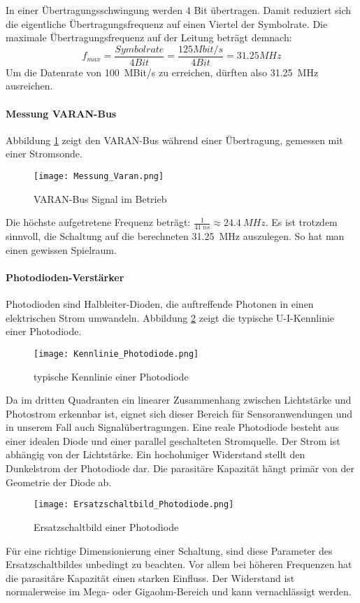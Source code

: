 In einer Übertragungsschwingung werden 4 Bit übertragen. Damit reduziert sich die eigentliche Übertragungsfrequenz auf einen Viertel der Symbolrate. Die maximale Übertragungsfrequenz auf der Leitung beträgt demnach: 
\begin{equation}\label{eq:MLT3}
f_{max}=\frac{Symbolrate}{4 Bit}=\frac{125Mbit/s}{4 Bit}=31.25 MHz
\end{equation}
Um die Datenrate von \SI{100}{MBit/s} zu erreichen, dürften also \SI{31.25}{MHz} ausreichen.

\paragraph{Messung VARAN-Bus}
Abbildung \ref{fig:Messung_Varan} zeigt den VARAN-Bus während einer Übertragung, gemessen mit einer Stromsonde.
\begin{figure}[H]
	\centering
	\texttt{[image: Messung\_Varan.png]}
	\caption{VARAN-Bus Signal im Betrieb}\label{fig:Messung_Varan}
\end{figure}
Die höchste aufgetretene Frequenz beträgt: $\frac{1}{\SI{41}{ns}}\approx \SI{24.4}{MHz}$. Es ist trotzdem sinnvoll, die Schaltung auf die berechneten \SI{31.25}{MHz} auszulegen. So hat man einen gewissen Spielraum.

\paragraph{Photodioden-Verstärker}
Photodioden sind Halbleiter-Dioden, die auftreffende Photonen in einen elektrischen Strom umwandeln. Abbildung \ref{fig:Kenn_Photodiode} zeigt die typische U-I-Kennlinie einer Photodiode.
\begin{figure}[h]
	\centering
	\texttt{[image: Kennlinie\_Photodiode.png]}
	\caption{typische Kennlinie einer Photodiode \cite{schleuniger}}\label{fig:Kenn_Photodiode}
\end{figure}
Da im dritten Quadranten ein linearer Zusammenhang zwischen Lichtstärke und Photostrom erkennbar ist, eignet sich dieser Bereich für Sensoranwendungen und in unserem Fall auch Signalübertragungen.
Eine reale Photodiode besteht aus einer idealen Diode und einer parallel geschalteten Stromquelle. Der Strom ist abhängig von der Lichtstärke. Ein hochohmiger Widerstand stellt den Dunkelstrom der Photodiode dar. Die parasitäre Kapazität hängt primär von der Geometrie der Diode ab.
 \begin{figure}[H]
 	\centering
 	\texttt{[image: Ersatzschaltbild\_Photodiode.png]}
 	\caption{Ersatzschaltbild einer Photodiode \cite{schleuniger}}\label{fig:Ersatz_Photodiode}
 \end{figure}
Für eine richtige Dimensionierung einer Schaltung, sind diese Parameter des Ersatzschaltbildes unbedingt zu beachten. Vor allem bei höheren Frequenzen hat die parasitäre Kapazität einen starken Einfluss. Der Widerstand ist normalerweise im Mega- oder Gigaohm-Bereich und kann vernachlässigt werden. \newline

